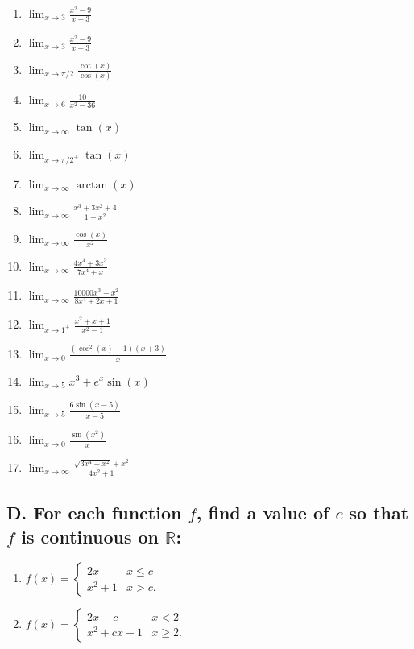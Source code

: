 \documentclass{article}
\begin{document}
\begin{multicols}{4}

\begin{enumerate}
\item $\displaystyle\lim_{x\to 3}\frac{x^2-9}{x+3}$
\item $\displaystyle\lim_{x\to 3}\frac{x^2-9}{x-3}$
\item $\displaystyle\lim_{x\to \pi/2}\frac{\cot(x)}{\cos(x)}$
\item $\displaystyle\lim_{x\to 6}\frac{10}{x^2-36}$
\item $\displaystyle\lim_{x\to \infty}\tan(x)$
\item $\displaystyle\lim_{x\to\pi/2^+} \tan(x)$
\item $\displaystyle\lim_{x\to \infty}\arctan(x)$
\item $\displaystyle\lim_{x\to \infty}\frac{x^3+3x^2+4}{1-x^2}$
\item $\displaystyle\lim_{x\to \infty}\frac{\cos(x)}{x^2}$
\item $\displaystyle\lim_{x\to \infty}\frac{4x^4+3x^3}{7x^4+x}$
\item $\displaystyle\lim_{x\to \infty}\frac{10000x^3-x^2}{8x^4+2x+1}$
\item $\displaystyle\lim_{x \rightarrow 1^+} \frac{x^2+x+1}{x^2-1}$
\item $\displaystyle\lim_{x\to 0}\frac{(\cos^2(x) - 1)(x+3)}{x}$
\item $\displaystyle\lim_{x\to 5}x^3+e^x\sin(x)$
\item $\displaystyle\lim_{x\to 5}\frac{6\sin(x-5)}{x-5}$
\item $\displaystyle\lim_{x\to 0}\frac{\sin(x^2)}{x}$
\item $\displaystyle\lim_{x\to \infty}\frac{\sqrt{3x^4-x^2}+x^2}{4x^2+1}$
\end{enumerate}

\end{multicols}

\subsection*{D. For each function $f$, find a value of $c$ so that $f$ is continuous on $\mathbb{R}$:}
\begin{multicols}{2}
\begin{enumerate}
\item $f(x)=\begin{cases}2x & x \leq c \\ x^2+1 & x > c.\end{cases}$
\item $f(x)=\begin{cases}2x+c & x < 2 \\ x^2 + cx +1 & x \geq 2.\end{cases}$
\end{enumerate}
\end{multicols}
\end{document}

